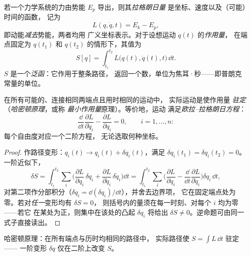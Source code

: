\begin{definition}[拉格朗日量与作用量]\label{def:b3:lagrangian-mechanics:action}
若一个力学系统的力由势能 $E_p$ 导出，则其\emph{拉格朗日量}
是坐标、速度以及（可能）时间的函数，
记为
\[
L(q, \dot q, t) = E_k - E_p ,
\]
即动能\emph{减去}势能，两者均用
广义坐标表示。对于设想运动 $q(t)$ 的\emph{作用量}，
在端点固定为 $q(t_1)$ 和 $q(t_2)$ 的情形下，其值为
\[
S[q] = \int_{t_1}^{t_2} L\big(q(t), \dot q(t), t\big)\,\dd t .
\]
$S$ 是一个\emph{泛函}：它作用于整条路径，
返回一个数，单位为焦耳·秒——即普朗克常量的单位。
\end{definition}

\begin{theorem}\label{thm:b3:lagrangian-mechanics:euler-lagrange}
在所有可能的、连接相同两端点且用时相同的运动中，
实际运动是使作用量
\emph{驻定}（\emph{哈密顿原理}，或称
\emph{最小作用量}原理）。等价地，运动
满足\emph{欧拉–拉格朗日方程}：
\[
\frac{\dd}{\dd t}\frac{\partial L}{\partial\dot q_i}
 - \frac{\partial L}{\partial q_i} = 0 ,
\qquad i = 1, \dots, n :
\]
每个自由度对应一个二阶方程，
无论选取何种坐标。
\end{theorem}

\begin{proof}
作路径变形：$q_i(t) \to q_i(t) + \delta q_i(t)$，满足
$\delta q_i(t_1) = \delta q_i(t_2) = 0$。一阶近似下，
\[
\delta S = \int_{t_1}^{t_2}\sum_i\Big(
  \frac{\partial L}{\partial q_i}\,\delta q_i
 + \frac{\partial L}{\partial\dot q_i}\,\delta\dot q_i\Big)\dd t
 = \int_{t_1}^{t_2}\sum_i\Big(
  \frac{\partial L}{\partial q_i}
 - \frac{\dd}{\dd t}\frac{\partial L}{\partial\dot q_i}\Big)\delta q_i\,\dd t ,
\]
对第二项作分部积分（$\delta\dot q_i =
\dd(\delta q_i)/\dd t$），并舍去边界项，
它在固定端点处为零。若对\emph{任一}变形均有 $\delta S = 0$，
则括号内的量须在每一时刻、对每个 $i$ 均为零——若它
在某处为正，则集中在该处的凸起 $\delta q_i$ 将给出
$\delta S \neq 0$。逆命题可由同一式子直接读出。
\end{proof}

\begin{omfigure}

{\small 哈密顿原理：在所有端点与历时均相同的路径中，
实际路径使 $S = \int L\,\dd t$ 驻定——
一阶变形 $\delta q$ 仅在二阶上改变 $S$。}
\end{omfigure}

